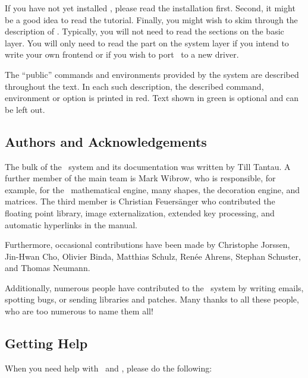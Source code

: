 If you have not yet installed \tikzname, please read the installation
first. Second, it might be a good idea to read the tutorial. Finally,
you might wish to skim through the description of \tikzname. Typically,
you will not need to read the sections on the basic layer. You will
only need to read the part on the system layer if you intend to write
your own frontend or if you wish to port \pgfname\ to a new driver.

The ``public'' commands and environments provided by the system
are described throughout the text. In each such description, the
described command, environment or option is printed in red. Text shown
in green is optional and can be left out.


\subsection{Authors and Acknowledgements}
\label{section-authors}

The bulk of the \pgfname\ system and its documentation was written by
Till Tantau. A further member of the main team is Mark Wibrow, who
is responsible, for example, for the \pgfname\ mathematical engine,
many shapes, the decoration engine, and matrices. The third member is
Christian Feuers\"anger who contributed the floating point library,
image externalization, extended key processing, and automatic hyperlinks
in the manual.

Furthermore, occasional contributions have been made by Christophe
Jorssen, Jin-Hwan Cho, Olivier Binda, Matthias Schulz, Ren\'ee Ahrens,
Stephan Schuster, and Thomas Neumann.

Additionally, numerous people have contributed to the \pgfname\ system
by writing emails, spotting bugs, or sending libraries and patches.
Many thanks to all these people, who are too numerous to name them
all!



\subsection{Getting Help}

When you need help with \pgfname\ and \tikzname, please do the
following:

